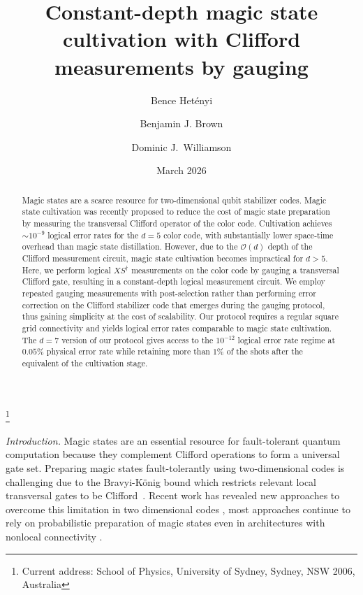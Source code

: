 \documentclass[aps,prx,twocolumn,secnumarabic,superscriptaddress,nofootinbib]{revtex4-2}
\begin{document}
\title{
Constant-depth magic state cultivation with Clifford measurements by gauging
}
\author{Bence Het\'enyi}
\author{Benjamin J. Brown}
\author{Dominic J.~Williamson}
\thanks{Current address: School of Physics, University of Sydney, Sydney, NSW 2006, Australia}

\date{March 2026}

\begin{abstract}
Magic states are a scarce resource for two-dimensional qubit stabilizer codes. Magic state cultivation was recently proposed to reduce the cost of magic state preparation by measuring the transversal Clifford operator of the color code. 
Cultivation achieves $\sim 10^{-9}$ logical error rates for the $d=5$ color code, with substantially lower space-time overhead than magic state distillation. However, due to the $\mathcal{O}(d)$ depth of the Clifford measurement circuit, magic state cultivation becomes impractical for $d>5$. Here, we perform logical $XS^\dagger$ measurements on the color code by gauging a transversal Clifford gate, resulting in a constant-depth logical measurement circuit. We employ repeated gauging measurements with post-selection rather than performing error correction on the Clifford stabilizer code that emerges during the gauging protocol, thus gaining simplicity at the cost of scalability.  Our protocol requires a regular square grid connectivity and yields logical error rates comparable to magic state cultivation. The $d=7$ version of our protocol gives access to the $10^{-12}$ logical error rate regime at $0.05\%$ physical error rate while retaining more than $1\%$ of the shots after the equivalent of the cultivation stage. 
\end{abstract}


\maketitle

{\it Introduction.} Magic states are an essential resource for fault-tolerant quantum computation because they complement Clifford operations to form a universal gate set. Preparing magic states fault-tolerantly using two-dimensional codes is challenging due to the Bravyi-K\"onig bound which restricts relevant local transversal gates to be Clifford~\cite{bravyiClassificationTopologicallyProtected2013}. Recent work has revealed new approaches to overcome this limitation in two dimensional codes \cite{davydovaUniversalFaultTolerant,bauerPlanarFaulttolerantCircuits2025,huang2025generatinglogicalmagicstates,kobayashi2025cliffordhierarchystabilizercodes,huang2026hybridlatticesurgerynonclifford,warman2026transversalcliffordhierarchygatesnonabelian}, most approaches continue to rely on probabilistic preparation of magic states even in architectures with nonlocal connectivity \cite{yoderTourGrossModular2025,webster2026pinnaclearchitecturereducingcost}.
\end{document}
